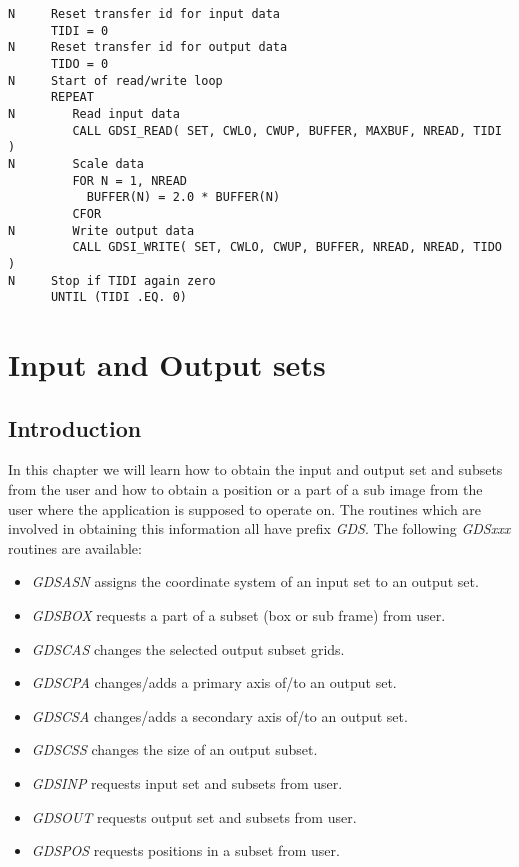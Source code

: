 \begin{verbatim}
N     Reset transfer id for input data
      TIDI = 0
N     Reset transfer id for output data
      TIDO = 0
N     Start of read/write loop
      REPEAT
N        Read input data
         CALL GDSI_READ( SET, CWLO, CWUP, BUFFER, MAXBUF, NREAD, TIDI )
N        Scale data
         FOR N = 1, NREAD
           BUFFER(N) = 2.0 * BUFFER(N)
         CFOR
N        Write output data
         CALL GDSI_WRITE( SET, CWLO, CWUP, BUFFER, NREAD, NREAD, TIDO )
N     Stop if TIDI again zero
      UNTIL (TIDI .EQ. 0)
\end{verbatim}

\chapter{Input and Output sets}

\section{Introduction}

In this chapter we will learn how to obtain the input and output set and
subsets from the user and how to obtain a position or a part of a sub
image from the user where the application is supposed to operate on.
The routines which are involved in obtaining this information all have
prefix {\sl GDS\/}.  The following {\sl GDSxxx\/} routines are
available:

\begin{itemize}

\item {\sl GDSASN\/} assigns the coordinate system
of an input set to an output set.

\item {\sl GDSBOX\/} requests a part of a subset
(box or sub frame) from user.

\item {\sl GDSCAS\/} changes the selected output
subset grids.

\item {\sl GDSCPA\/} changes/adds a primary axis
of/to an output set.

\item {\sl GDSCSA\/} changes/adds a secondary axis
of/to an output set.

\item {\sl GDSCSS\/} changes the size of an output
subset.

\item {\sl GDSINP\/} requests input set and subsets
from user.

\item {\sl GDSOUT\/} requests output set and subsets
from user.

\item {\sl GDSPOS\/} requests positions in a subset
from user.

\end{itemize}

